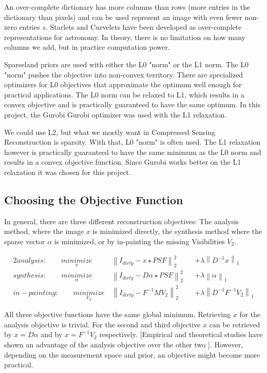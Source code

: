 An over-complete dictionary has more columns than rows (more entries in the dictionary than pixels) and can be used represent an image with even fewer non-zero entries $s$. Starlets\cite{starck2015starlet} and Curvelets\cite{starck2003astronomical} have been developed as over-complete representations for astronomy. In theory, there is no limitation on how many columns we add, but in practice computation power.

Sparseland priors are used with either the L0 "norm" or the L1 norm. The L0 "norm" pushes the objective into non-convex territory. There are specialized optimizers for L0 objectives that approximate the optimum well enough for practical applications. The L0 norm can be relaxed to L1, which results in a convex objective and is practically guaranteed to have the same optimum. In this project, the Gurobi Gurobi\cite{gurobi2018optimizer} optimizer was used with the L1 relaxation.

We could use L2, but what we mostly want in Compressed Sensing Reconstruction is sparsity. 
With that, L0 "norm" is often used. 
The L1 relaxation however is practically guaranteed to have the same minimum as the L0 norm and results in a convex objective function. Since Gurobi works better on the L1 relaxation it was chosen for this project.


\subsection{Choosing the Objective Function} \label{cs:objective}
In general, there are three different reconstruction objectives: The analysis method, where the image $x$ is minimized directly, the synthesis method where the sparse vector $\alpha$ is minimized, or by in-painting the missing Visibilities $V_2$.

\begin{alignat*}{2}
analysis:\qquad \underset{x}{minimize} \:& \left \| I_{dirty} - x \star PSF \right \|_2^2 &&+  \lambda \left \| D^{-1}x \right \|_1 \\
synthesis:\qquad \underset{\alpha}{minimize} \:& \left \| I_{dirty} - D \alpha \star PSF \right \|_2^2 &&+ \lambda \left \| \alpha \right \|_1 \\
in-painting:\qquad \underset{V_2}{minimize} \:& \left \|  I_{dirty} - F^{-1} M V_2 \right \|_2^2 &&+ \lambda \left \| D^{-1}F^{-1}V_2\right \|_1
\end{alignat*}

All three objective functions have the same global minimum. Retrieving $x$ for the analysis objective is trivial. For the second and third objective $x$ can be retrieved by $x = D\alpha$ and by $x = F^{-1}V_2$ respectively. [Empirical and theoretical studies have shown an advantage of the analysis objective over the other two \cite{something}]. However, depending on the measurement space and prior, an objective might become more practical. 

